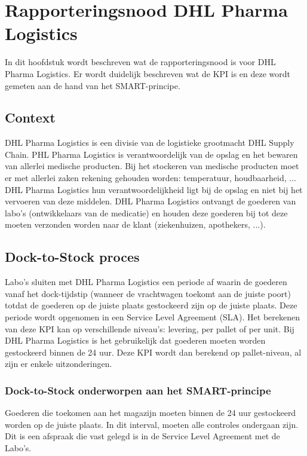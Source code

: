 
\chapter{Rapporteringsnood DHL Pharma Logistics}
\label{ch:rapporteringsnood}
In dit hoofdstuk wordt beschreven wat de rapporteringsnood is voor DHL Pharma Logistics. Er wordt duidelijk beschreven wat de KPI is en deze wordt gemeten aan de hand van het SMART-principe. 

\section{Context}
DHL Pharma Logistics is een divisie van de logistieke grootmacht DHL Supply Chain. PHL Pharma Logistics is verantwoordelijk van de opslag en het bewaren van allerlei medische producten. Bij het stockeren van medische producten moet er met allerlei zaken rekening gehouden worden: temperatuur, houdbaarheid, ... DHL Pharma Logistics hun verantwoordelijkheid ligt bij de opslag en niet bij het vervoeren van deze middelen. DHL Pharma Logistics ontvangt de goederen van labo's (ontwikkelaars van de medicatie) en houden deze goederen bij tot deze moeten verzonden worden naar de klant (ziekenhuizen, apothekers, ...).

\section{Dock-to-Stock proces}
Labo's sluiten met DHL Pharma Logistics een periode af waarin de goederen vanaf het dock-tijdstip (wanneer de vrachtwagen toekomt aan de juiste poort) totdat de goederen op de juiste plaats gestockeerd zijn op de juiste plaats.
Deze periode wordt opgenomen in een Service Level Agreement (SLA). Het berekenen van deze KPI kan op verschillende niveau's: levering, per pallet of per unit. Bij DHL Pharma Logistics is het gebruikelijk dat goederen moeten worden gestockeerd binnen de 24 uur. Deze KPI wordt dan berekend op pallet-niveau, al zijn er enkele uitzonderingen.

\subsection{Dock-to-Stock onderworpen aan het SMART-principe}
Goederen die toekomen aan het magazijn moeten binnen de 24 uur gestockeerd worden op de juiste plaats. In dit interval, moeten alle controles ondergaan zijn. Dit is een afspraak die vast gelegd is in de Service Level Agreement met de Labo's.

